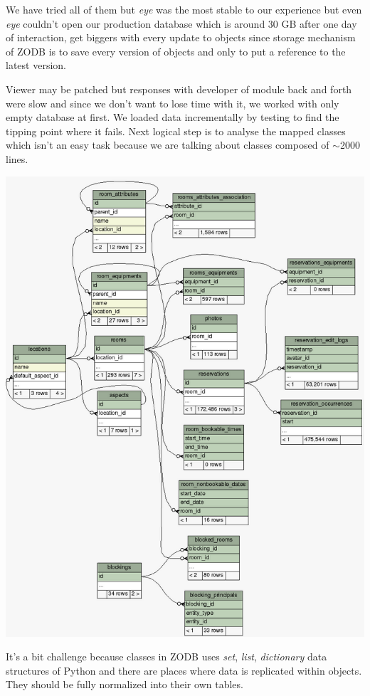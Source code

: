 We have tried all of them but \textit{eye} was the most stable to our experience but even \textit{eye} couldn't open our production database which is around 30 GB after one day of interaction, get biggers with every update to objects since storage mechanism of ZODB is to save every version of objects and only to put a reference to the latest version.

Viewer may be patched but responses with developer of module back and forth were slow and since we don't want to lose time with it, we worked with only empty database at first. We loaded data incrementally by testing to find the tipping point where it fails. Next logical step is to analyse the mapped classes which isn't an easy task because we are talking about classes composed of $\sim$2000 lines.

\hspace{-0.65cm}\includegraphics[scale=0.63]{6/figures/schema.png}

It's a bit challenge because classes in ZODB uses \textit{set}, \textit{list}, \textit{dictionary} data structures of Python and there are places where data is replicated within objects. They should be fully normalized into their own tables.

